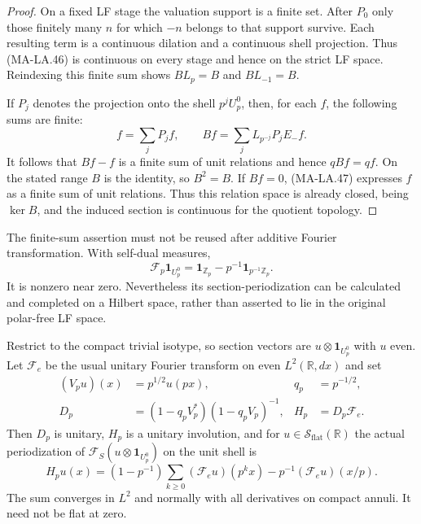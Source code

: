 \begin{proof}
On a fixed LF stage the valuation support is a finite set.
After $P_0$ only those finitely many $n$ for which $-n$
belongs to that support survive.  Each resulting term is
a continuous dilation and a continuous shell projection.
Thus (MA-LA.46) is continuous on every stage and hence on
the strict LF space.  Reindexing this finite sum shows
$BL_p=B$ and $BL_{-1}=B$.

If $P_j$ denotes the projection onto the shell $p^jU_p^0$,
then, for each $f$, the following sums are finite:
\[
       f=\sum_jP_jf,\qquad
       Bf=\sum_jL_{p^{-j}}P_jE_-f.
 \tag{MA-LA.47}
\]
It follows that $Bf-f$ is a finite sum of unit relations
and hence $qBf=qf$.  On the stated range $B$ is the identity,
so $B^2=B$.  If $Bf=0$, (MA-LA.47) expresses $f$ as a
finite sum of unit relations.  Thus this relation space is
already closed, being $\ker B$, and the induced section is
continuous for the quotient topology.
\end{proof}

The finite-sum assertion must not be reused after additive
Fourier transformation.  With self-dual measures,
\[
 \mathcal F_p\mathbf1_{U_p^0}
       =\mathbf1_{\mathbb Z_p}
                   -p^{-1}\mathbf1_{p^{-1}\mathbb Z_p}.
 \tag{MA-LA.48}
\]
It is nonzero near zero.  Nevertheless its section-periodization
can be calculated and completed on a Hilbert space, rather than
asserted to lie in the original polar-free LF space.

Restrict to the compact trivial isotype, so section vectors are
$u\otimes\mathbf1_{U_p^0}$ with $u$ even.  Let
$\mathcal F_e$ be the usual unitary Fourier transform on
even $L^2(\mathbb R,dx)$ and set
\[
 \begin{aligned}
 (V_pu)(x)&=p^{1/2}u(px),& q_p&=p^{-1/2},\\
 D_p&=(1-q_pV_p^*)(1-q_pV_p)^{-1},&
 H_p&=D_p\mathcal F_e .
 \end{aligned}
 \tag{MA-LA.49}
\]
Then $D_p$ is unitary, $H_p$ is a unitary involution, and
for $u\in\mathcal S_{\mathrm{flat}}(\mathbb R)$ the actual
periodization of $\mathcal F_S(u\otimes\mathbf1_{U_p^0})$
on the unit shell is
\[
 H_pu(x)=(1-p^{-1})\sum_{k\ge0}(\mathcal F_eu)(p^kx)
                         -p^{-1}(\mathcal F_eu)(x/p).
 \tag{MA-LA.50}
\]
The sum converges in $L^2$ and normally with all derivatives
on compact annuli.  It need not be flat at zero.

